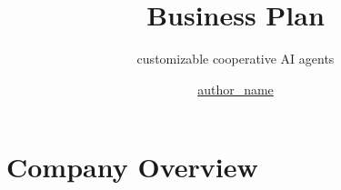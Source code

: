 \documentclass{beamer}
\title{Business Plan}
\subtitle{customizable cooperative AI agents}
\author{\href{auther_email}{author_name}}
\newcommand{\hrefcol}[2]{\textcolor{cyan}{\href{#1}{#2}}}
\begin{document}
\maketitle

%
%
%
%



\section{Company Overview}

\end{document}
